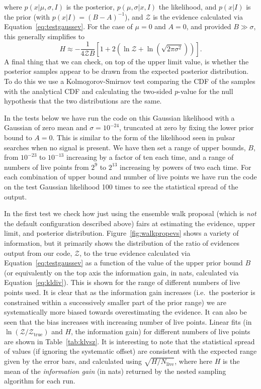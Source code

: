 where $p(x|\mu,\sigma,I)$ is the posterior, $p(\mu,\sigma|x,I)$ the likelihood, and $p(x|I)$ is the prior (with $p(x|I) = (B-A)^{-1}$), and $\mathcal{Z}$ is the
evidence calculated via Equation~\ref{eq:testgaussev}. For the case of $\mu=0$ and $A=0$, and provided $B \gg \sigma$, this generally simplifies
to
\begin{equation}
H \approx -\frac{1}{4\mathcal{Z}B}\left[1+2\left(\ln{\mathcal{Z}} +\ln{\left(\sqrt{2\pi\sigma^2}\right)}\right)\right].
\end{equation}
A final thing that we can check, on top of the upper limit value, is whether the posterior samples appear to be drawn from the expected
posterior distribution. To do this we use a Kolmogorov-Smirnov test comparing the CDF of the samples with the analytical CDF and calculating the
two-sided $p$-value for the null hypothesis that the two distributions are the same.

In the tests below we have run the code on this Gaussian likelihood with a Gaussian of zero mean and $\sigma = 10^{-24}$, truncated at zero
by fixing the lower prior bound to $A=0$. This is similar to the form of the likelihood seen in pulsar searches when no signal is present.
We have then set a range of upper bounds, $B$, from $10^{-23}$ to $10^{-13}$ increasing by a factor of ten each time, and a range of numbers of
live points from $2^9$ to $2^{13}$ increasing by powers of two each time. For each combination of upper bound and number of live points we have
run the code on the test Gaussian likelihood 100 times to see the statistical spread of the output.

In the first test we check how just using the ensemble walk proposal (which is {\it not} the default configuration described above) fairs at
estimating the evidence, upper limit, and posterior distribution. Figure~\ref{fig:walkpropevs} shows a variety of information, but it
primarily shows the distribution of the ratio of evidences output from our code, $\mathcal{Z}$, to the true evidence calculated via
Equation~\ref{eq:testgaussev} as a function of the value of the upper prior bound $B$ (or equivalently on the top axis the
information gain, in nats, calculated via Equation~\ref{eq:kldiv}). This is shown for the range of different numbers of live points used.
It is clear that as the information gain increases (i.e.\ the posterior is constrained within a successively smaller part of the
prior range) we are systematically more biased towards overestimating the evidence. It can also be seen that the bias increases with
increasing number of live points. Linear fits (in $\ln{(\mathcal{Z}/\mathcal{Z}_{\text{true}})}$ and $H$, the information gain) for different numbers
of live points are shown in Table~\ref{tab:klvsz}. It is interesting to note that the statistical spread of values (if ignoring the
systematic offset) are consistent with the expected range given by the error bars, and calculated using $\sqrt{H/N_{\text{live}}}$, where here
$H$ is the mean of the {\it information gain} (in nats) returned by the nested sampling algorithm for each run.

